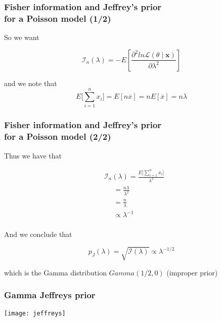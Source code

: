 \documentclass[border=5mm, convert, usenames, dvipsnames,beamer]{standalone}
\begin{document}
\begin{frame}[ fragile]{}

\frametitle{Fisher information and Jeffrey's prior \\ for a Poisson model (1/2)}

\vspace{10mm}
\noindent
So we want

$$
 \mathcal{I}_{n}(\lambda) = -E\left[ \frac{ \partial^{2} ln \mathcal{L}(\theta \mid \textbf{x} )} {\partial \lambda^{2}}  \right]
$$

\noindent
and we note that
$$  E \bigg[   \sum_{i=1}^{n}x_{i} \bigg] = E[n  \overline{x}]     = n  E [\overline{x}] = n \lambda $$  



\par
\end{frame}



\begin{frame}[ fragile]{}
\frametitle{Fisher information and Jeffrey's prior \\ for a Poisson model (2/2)}

\vspace{55}
\noindent
Thus we have that

$$
\begin{align*} 
& \mathcal{I}_{n}(\lambda) = \frac{E \bigg[   \sum_{i=1}^{n}x_{i} \bigg] }{ \lambda^{2}}  \\
& \ \ \ \ \ \   = \frac{n \lambda}{ \lambda^{2}}   \\
& \ \ \ \ \ \   = \frac{n  }{\lambda }     \\
& \ \ \ \ \ \   \propto \lambda^{-1} \\
\end{align*}
$$

\noindent
And we conclude that

$$
p_{J}(\lambda) = \sqrt{\mathcal{I}(\lambda
)}  \propto  \lambda^{-1/2}
$$

\noindent
which is the Gamma distribution $Gamma(1/2, 0)$ (improper prior)

\par
\end{frame}



\begin{frame}[ fragile]{}

\frametitle{Gamma Jeffreys prior}

\vspace{30}
\noindent


 \texttt{[image: jeffreys]}



\end{frame}
\end{document}
